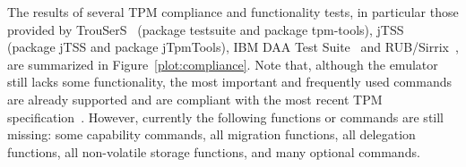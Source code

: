 \documentclass[runningheads]{llncs}
\begin{document}
The results of several TPM compliance and functionality tests, in particular
those provided by TrouSerS~\cite{trousers} (package testsuite and package
tpm-tools), jTSS~\cite{jTSS} (package jTSS and package jTpmTools), IBM DAA Test
Suite~\cite{ibmdaatest} and RUB/Sirrix~\cite{Sadeghi}, are summarized in
Figure~\ref{plot:compliance}. Note that, although the emulator still lacks some
functionality, the most important and frequently used commands are already
supported and are compliant with the most recent TPM specification~\cite{TPM}.
However, currently the following functions or commands are still missing:
some capability commands, all migration functions, all delegation functions,
all non-volatile storage functions, and many optional commands.
\end{document}
